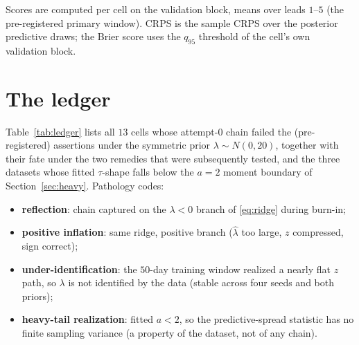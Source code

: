 \documentclass[11pt]{article}
\begin{document}
Scores are computed per cell on the validation block, means over leads
$1$--$5$ (the pre-registered primary window). CRPS is the sample CRPS
over the posterior predictive draws; the Brier score uses the $q_{95}$
threshold of the cell's own validation block.

\section{The ledger}

Table~\ref{tab:ledger} lists all $13$ cells whose attempt-0 chain failed
the (pre-registered) assertions under the symmetric prior
$\lambda \sim N(0,20)$, together with their fate under the two remedies
that were subsequently tested, and the three datasets whose fitted
$\tau$-shape falls below the $a=2$ moment boundary of
Section~\ref{sec:heavy}. Pathology codes:

\begin{itemize}\itemsep1pt
  \item[\textbf{R}] \textbf{reflection}: chain captured on the
        $\lambda<0$ branch of \eqref{eq:ridge} during burn-in;
  \item[\textbf{P}] \textbf{positive inflation}: same ridge, positive
        branch ($\hat\lambda$ too large, $z$ compressed, sign correct);
  \item[\textbf{U}] \textbf{under-identification}: the $50$-day training
        window realized a nearly flat $z$ path, so $\lambda$ is not
        identified by the data (stable across four seeds and both priors);
  \item[\textbf{H}] \textbf{heavy-tail realization}: fitted $a < 2$, so
        the predictive-spread statistic has no finite sampling variance
        (a property of the dataset, not of any chain).
\end{itemize}
\end{document}

